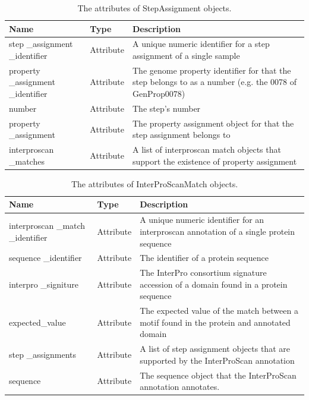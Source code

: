 \begin{table}[!ht]
\centering
\caption{The attributes of StepAssignment objects.}
\label{tab:stepassignmentobject}
\begin{tabular}{|p{2.7cm}|p{2cm}|p{10cm}|}
\hline
\textbf{Name} & \textbf{Type} & \textbf{Description} \\ \hline
step \_assignment \_identifier & Attribute & A unique numeric identifier for a step assignment of a single sample \\ \hline
property \_assignment \_identifier & Attribute & The genome property identifier for that the step belongs to as a number (e.g. the 0078 of GenProp0078) \\ \hline
number & Attribute & The step's number \\ \hline
property \_assignment & Attribute & The property assignment object for that the step assignment belongs to \\ \hline
interproscan \_matches & Attribute & A list of interproscan match objects that support the existence of property assignment \\ \hline
\end{tabular}
\end{table}

\begin{table}[!ht]
\centering
\caption{The attributes of InterProScanMatch objects.}
\label{tab:interproscanannotationobject}
\begin{tabular}{|p{2.7cm}|p{2cm}|p{10cm}|}
\hline
\textbf{Name} & \textbf{Type} & \textbf{Description} \\ \hline
interproscan \_match \_identifier & Attribute & A unique numeric identifier for an interproscan annotation of a single protein sequence \\ \hline
sequence \_identifier & Attribute & The identifier of a protein sequence \\ \hline
interpro \_signiture & Attribute & The InterPro consortium signature accession of a domain found in a protein sequence \\ \hline
expected\_value & Attribute & The expected value of the match between a motif found in the protein and annotated domain \\ \hline
step \_assignments & Attribute & A list of step assignment objects that are supported by the InterProScan annotation \\ \hline
sequence & Attribute & The sequence object that the InterProScan annotation annotates. \\ \hline
\end{tabular}
\end{table}

